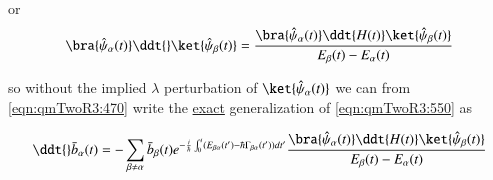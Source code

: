 or
\begin{equation}\label{eqn:qmTwoR3:650}
\bra{\hat{\psi}_\alpha(t)}
\ddt{}\ket{\hat{\psi}_\beta(t)} 
=
\frac{
\bra{\hat{\psi}_\alpha(t)}
\ddt{H(t)} \ket{\hat{\psi}_\beta(t)} 
}
{E_\beta(t) - E_\alpha(t)}
\end{equation}

so without the implied $\lambda$ perturbation of $\ket{\hat{\psi}_\alpha(t)}$ we can from \ref{eqn:qmTwoR3:470} write the \underline{exact} generalization of \ref{eqn:qmTwoR3:550} as

\begin{equation}\label{eqn:qmTwoR3:470b}
\ddt{}\bar{b}_\alpha(t)
=
-\sum_{\beta \ne \alpha} \bar{b}_\beta(t)
e^{-\frac{i}{\hbar} \int_0^t (E_{\beta\alpha}(t') - \hbar \Gamma_{\beta\alpha}(t')) dt'}
\frac{
\bra{\hat{\psi}_\alpha(t)}
\ddt{H(t)} \ket{\hat{\psi}_\beta(t)} 
}
{E_\beta(t) - E_\alpha(t)}
\end{equation}

\EndArticle

